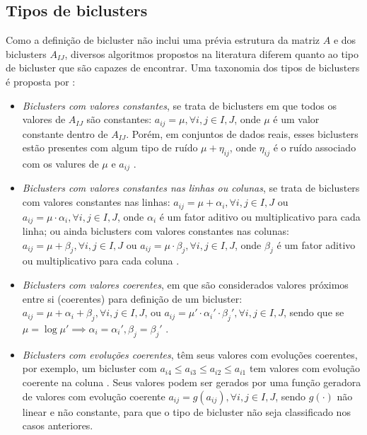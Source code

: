 \documentclass[normaltoc, espacoumemeio, pnumromarab,ruledheader]{abnt}
\begin{document}
   \subsection{Tipos de biclusters}
   \label{sec:tiposbic}

    Como a definição de bicluster não inclui uma prévia estrutura da matriz $A$ e dos biclusters $A_{IJ}$, diversos algoritmos propostos na literatura diferem quanto ao tipo de bicluster que são capazes de encontrar. Uma taxonomia dos tipos de biclusters é proposta por :
     \begin{itemize}
      \item \textit{Biclusters com valores constantes}, se trata de biclusters em que todos os valores de $A_{IJ}$ são constantes: $a_{ij} = \mu, \forall i,j \in I,J$, onde $\mu$ é um valor constante dentro de $A_{IJ}$. Porém, em conjuntos de dados reais, esses biclusters estão presentes com algum tipo de ruído $\mu + \eta_{ij}$, onde $\eta_{ij}$ é o ruído associado com os valures de $\mu$ e $a_{ij}$ \cite{Madeira2004}.
      \item \textit{Biclusters com valores constantes nas linhas ou colunas}, se trata de biclusters com valores constantes nas linhas: $a_{ij} = \mu + \alpha_i, \forall i,j \in I,J$ ou $a_{ij} = \mu \cdot \alpha_i, \forall i,j \in I,J$, onde $\alpha_i$ é um fator aditivo ou multiplicativo para cada linha; ou ainda biclusters com valores constantes nas colunas: $a_{ij} = \mu + \beta_j, \forall i,j \in I,J$ ou $a_{ij} = \mu \cdot \beta_j, \forall i,j \in I,J$, onde $\beta_j$ é um fator aditivo ou multiplicativo para cada coluna \cite{Madeira2004}.
      \item \textit{Biclusters com valores coerentes}, em que são considerados valores próximos entre si (coerentes) para definição de um bicluster: $a_{ij} = \mu + \alpha_i + \beta_j, \forall i,j \in I,J$, ou $a_{ij} = \mu' \cdot \alpha_i' \cdot \beta_j', \forall i,j \in I,J$, sendo que se $\mu = \log \mu'\implies \alpha_i = \alpha_i', \beta_j = \beta_j'$ \cite{Madeira2004}.
      \item \textit{Biclusters com evoluções coerentes}, têm seus valores com evoluções coerentes, por exemplo, um bicluster com $a_{i4} \leq a_{i3} \leq a_{i2} \leq a_{i1}$ tem valores com evolução coerente na coluna \cite{Madeira2004}. Seus valores podem ser gerados por uma função geradora de valores com evolução coerente $a_{ij} = g(a_{ij}), \forall i,j \in I,J$, sendo $g(\cdot)$ não linear e não constante, para que o tipo de bicluster não seja classificado nos casos anteriores.
     \end{itemize}
    
\end{document}
